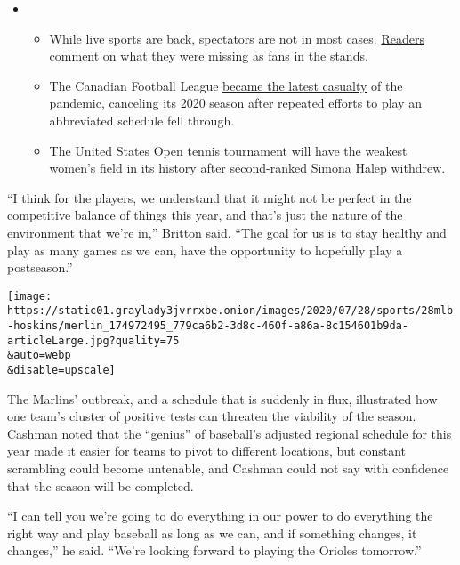 \begin{itemize}
\item
  \begin{itemize}
  \tightlist
  \item
    While live sports are back, spectators are not in most cases.
    \href{https://www.nytimes3xbfgragh.onion/2020/08/19/sports/empty-stadiums-live-fans.html?action=click\&pgtype=Article\&state=default\&region=MAIN_CONTENT_2\&context=storylines_keepup}{Readers}
    comment on what they were missing as fans in the stands.
  \item
    The Canadian Football League
    \href{https://www.nytimes3xbfgragh.onion/2020/08/18/sports/cfl-season-canceled.html?action=click\&pgtype=Article\&state=default\&region=MAIN_CONTENT_2\&context=storylines_keepup}{became
    the latest casualty} of the pandemic, canceling its 2020 season
    after repeated efforts to play an abbreviated schedule fell through.
  \item
    The United States Open tennis tournament will have the weakest
    women's field in its history after second-ranked
    \href{https://www.nytimes3xbfgragh.onion/2020/08/17/sports/tennis/us-open-women.html?action=click\&pgtype=Article\&state=default\&region=MAIN_CONTENT_2\&context=storylines_keepup}{Simona
    Halep withdrew}.
  \end{itemize}
\end{itemize}

``I think for the players, we understand that it might not be perfect in
the competitive balance of things this year, and that's just the nature
of the environment that we're in,'' Britton said. ``The goal for us is
to stay healthy and play as many games as we can, have the opportunity
to hopefully play a postseason.''

\texttt{[image: https://static01.graylady3jvrrxbe.onion/images/2020/07/28/sports/28mlb-hoskins/merlin\_174972495\_779ca6b2-3d8c-460f-a86a-8c154601b9da-articleLarge.jpg?quality=75\\\&auto=webp\\\&disable=upscale]}

The Marlins' outbreak, and a schedule that is suddenly in flux,
illustrated how one team's cluster of positive tests can threaten the
viability of the season. Cashman noted that the ``genius'' of baseball's
adjusted regional schedule for this year made it easier for teams to
pivot to different locations, but constant scrambling could become
untenable, and Cashman could not say with confidence that the season
will be completed.

``I can tell you we're going to do everything in our power to do
everything the right way and play baseball as long as we can, and if
something changes, it changes,'' he said. ``We're looking forward to
playing the Orioles tomorrow.''

